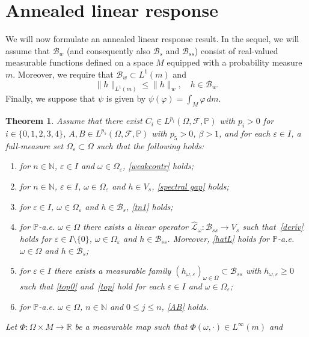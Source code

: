 \documentclass[11pt,reqno,a4paper]{article}
\newtheorem{maintheorem}{Theorem}
\theoremstyle{special}
\renewcommand{\epsilon}{\varepsilon}
\renewcommand{\L}{\mathcal{L}}
\def\N{\mathbb{N}}
\def\R{\mathbb{R}}
\def\B{\mathcal{B}}
\begin{document}
\section{Annealed linear response}\label{ALR}
We will now formulate an annealed linear response result. 
In the sequel, we will assume that $\B_w$ (and consequently also $\B_s$ and $\B_{ss}$) consist of real-valued measurable functions defined on a space $M$ equipped with a probability measure $m$. Moreover, we require that  
$\B_w\subset L^1(m)$ and 
\[
\|h\|_{L^1(m)} \le \|h\|_w, \quad h\in \B_w.
\]
Finally,  we suppose that $\psi$ is given by $\psi(\varphi)=\int_M \varphi \, dm$.
\begin{maintheorem}\label{annealed}
Assume that there exist $C_i\in L^{p_i}(\Omega, \mathcal F, \mathbb P)$ with $p_i>0$ for $i\in \{0, 1, 2, 3, 4\}$, $A, B\in L^{p_5}(\Omega, \mathcal F, \mathbb P)$ with $p_5>0$, $\beta >1$, and for each $\epsilon \in I$, a full-measure set $\Omega_\epsilon \subset \Omega$ such that the following holds:
\begin{enumerate}
\item for $n\in \N$, $\epsilon \in I$ and $\omega \in \Omega_\epsilon$, \eqref{weakcontr} holds;
\item for  $n\in \N$, $\epsilon \in I$, $\omega \in \Omega_\epsilon$ and $h\in V_s$, \eqref{spectral gap} holds;
\item for  $\epsilon \in I$, $\omega \in \Omega_\epsilon$ and $h\in \B_s$, \eqref{tn1} holds;
\item for $\mathbb P$-a.e. $\omega \in \Omega$ there exists a linear operator $\hat{\L}_\omega \colon \B_{ss}\to V_s$ such that~\eqref{deriv} holds for $\epsilon \in I\setminus \{0\}$, $\omega \in \Omega_\epsilon$ and $h\in \B_{ss}$. Moreover, 
\eqref{hatL} holds for $\mathbb P$-a.e. $\omega \in \Omega$ and $h\in \B_s$;
\item for $\epsilon \in I$ there exists a measurable family $(h_{\omega, \epsilon})_{\omega \in \Omega}\subset \B_{ss}$ with $h_{\omega, \epsilon}\ge 0$ such that \eqref{top0} and~\eqref{top} hold for each $\epsilon \in I$ and $\omega \in \Omega_\epsilon$;
\item for $\mathbb P$-a.e. $\omega \in \Omega$, $n\in \N$ and $0\le j \le n$, \eqref{AB} holds.
\end{enumerate}
Let $\Phi\colon \Omega \times M \to \R$ be a measurable map such that $\Phi (\omega, \cdot)\in L^\infty (m)$ and 

\end{maintheorem}
\end{document}
